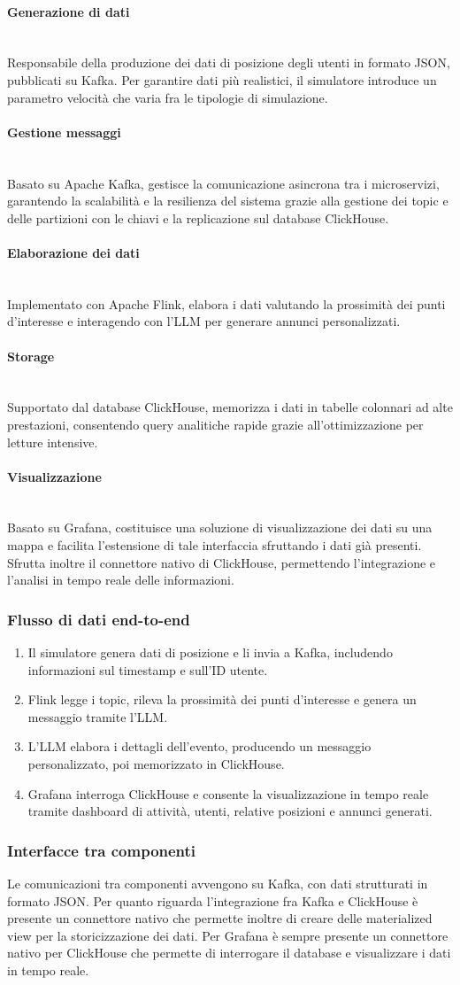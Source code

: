 \documentclass[10pt]{article}
\newcommand{\myparagraph}[1]{\paragraph{#1}\mbox{}\\}
\begin{document}
\myparagraph{Generazione di dati}
Responsabile della produzione dei dati di posizione degli utenti in formato JSON, pubblicati su Kafka. 
Per garantire dati più realistici, il simulatore introduce un parametro velocità che varia fra le tipologie di simulazione.

\myparagraph{Gestione messaggi}
Basato su Apache Kafka, gestisce la comunicazione asincrona tra i microservizi, garantendo la scalabilità e la resilienza del sistema grazie alla gestione dei topic e delle partizioni con le chiavi e la replicazione sul database ClickHouse.

\myparagraph{Elaborazione dei dati}
Implementato con Apache Flink, elabora i dati valutando la prossimità dei punti d’interesse e interagendo con 
l’LLM per generare annunci personalizzati. 

\myparagraph{Storage}
Supportato dal database ClickHouse, memorizza i dati in tabelle colonnari ad alte prestazioni, consentendo query 
analitiche rapide grazie all’ottimizzazione per letture intensive. 

\myparagraph{Visualizzazione}
Basato su Grafana, costituisce una soluzione di visualizzazione dei dati su una mappa e facilita l'estensione di tale interfaccia sfruttando i dati già presenti. 
Sfrutta inoltre il connettore nativo di ClickHouse, permettendo l'integrazione e l'analisi in tempo reale delle informazioni.

\subsubsection{Flusso di dati end-to-end}
\begin{enumerate}
    \item Il simulatore genera dati di posizione e li invia a Kafka, includendo informazioni sul timestamp e sull’ID utente.
    \item Flink legge i topic, rileva la prossimità dei punti d’interesse e genera un messaggio tramite l'LLM.
    \item L’LLM elabora i dettagli dell’evento, producendo un messaggio personalizzato, poi memorizzato in ClickHouse.
    \item Grafana interroga ClickHouse e consente la visualizzazione in tempo reale tramite dashboard di attività, utenti, relative posizioni e annunci generati.
\end{enumerate}

\subsubsection{Interfacce tra componenti}
Le comunicazioni tra componenti avvengono su Kafka, con dati strutturati in formato JSON. Per quanto riguarda l'integrazione fra Kafka e ClickHouse è presente un connettore nativo che permette inoltre di creare delle materialized view per la storicizzazione dei dati. Per Grafana è sempre presente un connettore nativo per ClickHouse che permette di interrogare il database e visualizzare i dati in tempo reale.
\end{document}
